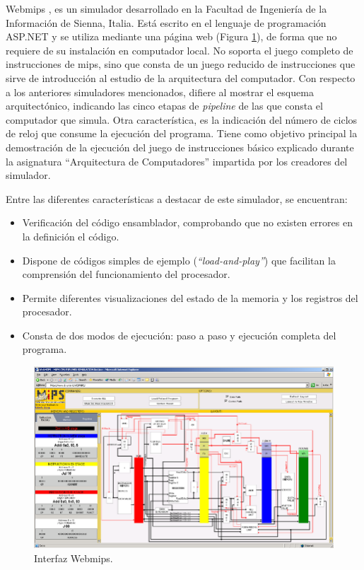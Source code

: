 Web\acrshort{mips} \cite{branovic2004webmips}, es un simulador desarrollado en la Facultad de Ingeniería de la Información de Sienna, Italia. Está escrito en el lenguaje de programación ASP.NET y se utiliza mediante una página web (Figura \ref{fig:webmips_figure}), de forma que no requiere de su instalación en computador local. No soporta el juego completo de instrucciones de \acrshort{mips}, sino que consta de un juego reducido de instrucciones que sirve de introducción al estudio de la arquitectura del computador. Con respecto a los anteriores simuladores mencionados, difiere al mostrar el esquema arquitectónico, indicando las cinco etapas de \emph{\gls{pipeline}} de las que consta el computador que simula. Otra característica, es la indicación del número de ciclos de reloj que consume la ejecución del programa. Tiene como objetivo principal la demostración de la ejecución del juego de instrucciones básico explicado durante la asignatura ``Arquitectura de Computadores'' impartida por los creadores del simulador.

Entre las diferentes características a destacar de este simulador, se encuentran:

\begin{itemize}
	
\item Verificación del código \gls{ensamblador}, comprobando que no existen errores en la definición el código.

\item Dispone de códigos simples de ejemplo (\textit{``load-and-play''}) que facilitan la comprensión del funcionamiento del procesador.

\item Permite diferentes visualizaciones del estado de la memoria y los registros del procesador.

\item Consta de dos modos de ejecución: paso a paso y ejecución completa del programa.
	
\end{itemize}

\begin{figure}[htbp]
 	\centering
 	\includegraphics[width=15cm]{figures/webmips_figure}
 	\caption{ Interfaz Web\acrshort{mips}.}
	\label{fig:webmips_figure}
\end{figure}

